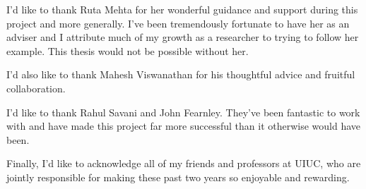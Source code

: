 I'd like to thank Ruta Mehta for her wonderful guidance and support during this project and more generally. I've been tremendously fortunate to have her as an adviser and I attribute much of my growth as a researcher to trying to follow her example. This thesis would not be possible without her.

I'd also like to thank Mahesh Viswanathan for his thoughtful advice and fruitful collaboration.

I'd like to thank Rahul Savani and John Fearnley. They've been fantastic to work with and have made this project far more successful than it otherwise would have been.

Finally, I'd like to acknowledge all of my friends and professors at UIUC, who are jointly responsible for making these past two years so enjoyable and rewarding.

